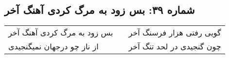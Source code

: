\begin{center}
\section*{شماره ۳۹: بس زود به مرگ کردی آهنگ آخر}
\label{sec:039}
\begin{longtable}{l p{0.5cm} r}
بس زود به مرگ کردی آهنگ آخر
&&
گویی رفتی هزار فرسنگ آخر
\\
از ناز چو درجهان نمیگنجیدی
&&
چون گنجیدی در لحد تنگ آخر
\\
\end{longtable}
\end{center}

